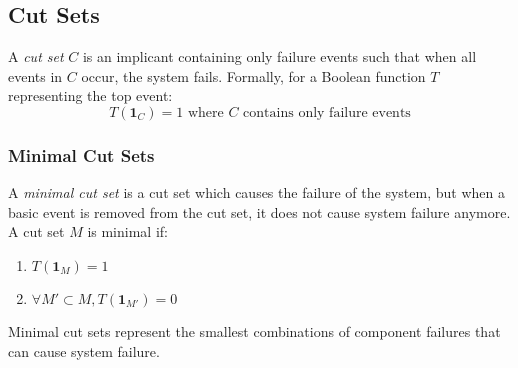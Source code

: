 \subsection{Cut Sets}
A \emph{cut set} $C$ is an implicant containing only failure events such that when all events in $C$ occur, the system fails. Formally, for a Boolean function $T$ representing the top event:
\[
T(\mathbf{1}_C) = 1 \text{ where } C \text{ contains only failure events}
\]

\subsubsection{Minimal Cut Sets}
A \emph{minimal cut set} is a cut set which causes the failure of the system, but when a basic event is removed from the cut set, it does not cause system failure anymore. A cut set $M$ is minimal if:
\begin{enumerate}
  \item $T(\mathbf{1}_M) = 1$
  \item $\forall M' \subset M, T(\mathbf{1}_{M'}) = 0$
\end{enumerate}
Minimal cut sets represent the smallest combinations of component failures that can cause system failure.

